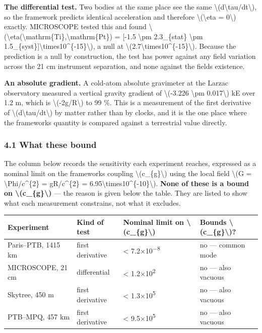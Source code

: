 \documentclass[
  10pt,
]{article}
\begin{document}
\textbf{The differential test.} Two bodies at the same place see the
same \textbackslash(d\textbackslash tau/dt\textbackslash), so the
framework predicts identical acceleration and therefore
\textbackslash(\textbackslash eta = 0\textbackslash) exactly. MICROSCOPE
tested this and found
\textbackslash(\textbackslash eta(\textbackslash mathrm\{Ti\},\textbackslash mathrm\{Pt\})
= {[}-1.5 \textbackslash pm 2.3\_\{stat\} \textbackslash pm
1.5\_\{syst\}{]}\textbackslash times10\^{}\{-15\}\textbackslash), a null
at \textbackslash(2.7\textbackslash times10\^{}\{-15\}\textbackslash).
Because the prediction is a null by construction, the test has power
against any field variation across the 21 cm instrument separation, and
none against the field\textquotesingle s existence.

\textbf{An absolute gradient.} A cold-atom absolute gravimeter at the
Larzac observatory measured a vertical gravity gradient of
\textbackslash(-3.226 \textbackslash pm 0.017\textbackslash) kE over 1.2
m, which is \textbackslash(-2g/R\textbackslash) to 99 \%. This is a
measurement of the first derivative of
\textbackslash(d\textbackslash tau/dt\textbackslash) by matter rather
than by clocks, and it is the one place where the
framework\textquotesingle s quantity is compared against a terrestrial
value directly.

\hypertarget{what-these-bound}{%
\subsubsection{4.1 What these bound}\label{what-these-bound}}

The column below records the sensitivity each experiment reaches,
expressed as a nominal limit on the framework\textquotesingle s coupling
\textbackslash(c\_\{g\}\textbackslash) using the local field
\textbackslash(G = \textbackslash Phi/c\^{}\{2\} = gR/c\^{}\{2\} =
6.95\textbackslash times10\^{}\{-10\}\textbackslash). \textbf{None of
these is a bound on \textbackslash(c\_\{g\}\textbackslash)} --- the
reason is given below the table. They are listed to show what each
measurement constrains, not what it excludes.

\begin{longtable}[]{@{}llll@{}}
\toprule\noalign{}
Experiment & Kind of test & Nominal limit on
\textbackslash(c\_\{g\}\textbackslash) & Bounds
\textbackslash(c\_\{g\}\textbackslash)? \\
\midrule\noalign{}
\endhead
\bottomrule\noalign{}
\endlastfoot
Paris--PTB, 1415 km & first derivative & \textless{}
7.2×10\textsuperscript{−8} & no --- common mode \\
MICROSCOPE, 21 cm & differential & \textless{} 1.2×10\textsuperscript{2}
& no --- also vacuous \\
Skytree, 450 m & first derivative & \textless{}
1.3×10\textsuperscript{5} & no --- also vacuous \\
PTB--MPQ, 457 km & first derivative & \textless{}
9.5×10\textsuperscript{5} & no --- also vacuous \\
\end{longtable}
\end{document}
